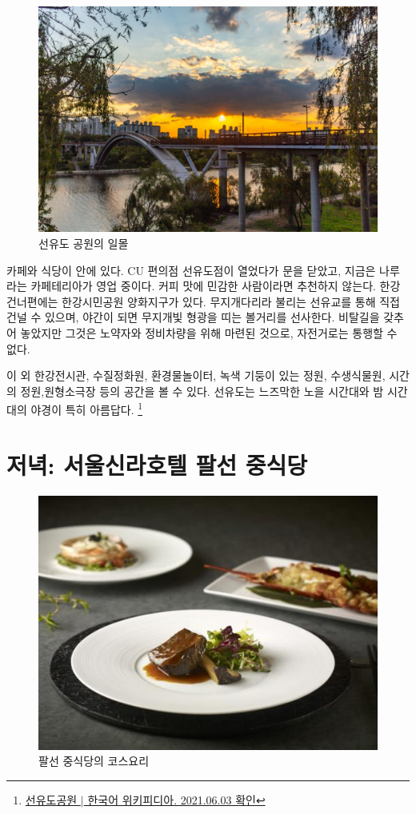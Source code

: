 \begin{figure}
    \centering
    \includegraphics[width=.6\textwidth]{e_img/ww_-006.jpg}
    \caption{선유도 공원의 일몰}
    \label{fig:haryu7}
\end{figure}

카페와 식당이 안에 있다. CU 편의점 선유도점이 열었다가 문을 닫았고, 지금은 
나루라는 카페테리아가 영업 중이다. 커피 맛에 민감한 사람이라면 추천하지 않는다. 한강 
건너편에는 한강시민공원 양화지구가 있다. 무지개다리라 불리는 선유교를 통해 직접 건널 수
있으며, 야간이 되면 무지개빛 형광을 띠는 볼거리를 선사한다. 비탈길을 갖추어 놓았지만
그것은 노약자와 정비차량을 위해 마련된 것으로, 자전거로는 통행할 수 없다.


이 외 한강전시관, 수질정화원, 환경물놀이터, 녹색 기둥이 있는 정원, 수생식물원,
시간의 정원,원형소극장 등의 공간을 볼 수 있다. 선유도는 느즈막한 노을 시간대와 밤 
시간대의 야경이 특히 아름답다.
\footnote{\href{https://ko.wikipedia.org/wiki/선유도공원}{선유도공원 $|$ 한국어 위키피디아. 2021.06.03 확인}}


\section{저녁: 서울신라호텔 팔선 중식당}


\begin{figure}
    \centering
    \includegraphics[width=.6\textwidth]{e_img/ww_-007.jpg}
    \caption{팔선 중식당의 코스요리}
    \label{fig:haryu8}
\end{figure}


